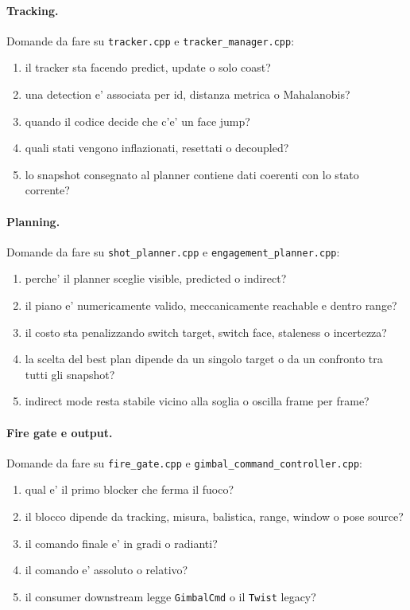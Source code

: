 \documentclass[11pt,a4paper]{article}
\newcommand{\code}[1]{\texttt{#1}}
\begin{document}
\paragraph{Tracking.}
Domande da fare su \code{tracker.cpp} e \code{tracker\_manager.cpp}:
\begin{enumerate}[leftmargin=1.4em]
  \item il tracker sta facendo predict, update o solo coast?
  \item una detection e' associata per id, distanza metrica o Mahalanobis?
  \item quando il codice decide che c'e' un face jump?
  \item quali stati vengono inflazionati, resettati o decoupled?
  \item lo snapshot consegnato al planner contiene dati coerenti con lo stato corrente?
\end{enumerate}

\paragraph{Planning.}
Domande da fare su \code{shot\_planner.cpp} e \code{engagement\_planner.cpp}:
\begin{enumerate}[leftmargin=1.4em]
  \item perche' il planner sceglie visible, predicted o indirect?
  \item il piano e' numericamente valido, meccanicamente reachable e dentro range?
  \item il costo sta penalizzando switch target, switch face, staleness o incertezza?
  \item la scelta del best plan dipende da un singolo target o da un confronto tra tutti gli snapshot?
  \item indirect mode resta stabile vicino alla soglia o oscilla frame per frame?
\end{enumerate}

\paragraph{Fire gate e output.}
Domande da fare su \code{fire\_gate.cpp} e \code{gimbal\_command\_controller.cpp}:
\begin{enumerate}[leftmargin=1.4em]
  \item qual e' il primo blocker che ferma il fuoco?
  \item il blocco dipende da tracking, misura, balistica, range, window o pose source?
  \item il comando finale e' in gradi o radianti?
  \item il comando e' assoluto o relativo?
  \item il consumer downstream legge \code{GimbalCmd} o il \code{Twist} legacy?
\end{enumerate}
\end{document}
